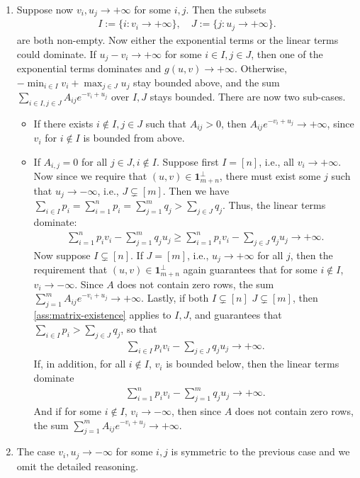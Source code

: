 \begin{enumerate}
     \item Suppose now $v_i, u_j\rightarrow +\infty$ for some $i,j$. Then the subsets 
\begin{align*}
    I:=\{i: v_i \rightarrow +\infty\},\quad J:=\{j: u_j \rightarrow +\infty\}.
\end{align*}
    are both non-empty. Now either the exponential terms or the linear terms could dominate. If $u_j-v_i \rightarrow +\infty$ for some $i\in I, j\in J$, then one of the exponential terms dominates and $g(u,v)\rightarrow +\infty$. Otherwise, $-\min_{i\in I} v_i+\max_{j\in J} u_j$ stay bounded above, and the sum $\sum_{i\in I, j\in J}A_{ij}e^{-v_{i}+u_{j}}$ over $I,J$ stays bounded. There are now two sub-cases. 
     \begin{itemize}
         \item If there exists $i \notin I,j\in J$ such that $A_{ij} >0$, then  $A_{ij}e^{-v_{i}+u_{j}} \rightarrow +\infty$, since $v_i$ for $i\notin I$ is bounded from above.
         \item If $A_{i,j}=0$ for all $j\in J,i\notin I$. Suppose first $I=[n]$, i.e., all $v_i \rightarrow +\infty$. Now since we require that $(u,v) \in 
 \mathbf{1}_{m+n}^\perp$, there must exist some $j$ such that $u_j \rightarrow -\infty$, i.e., $J\subsetneq [m]$. Then we have $\sum_{i\in I} p_i=\sum_{i=1}^n p_i=\sum_{j=1}^m q_j > \sum_{j\in J} q_j$. 
 Thus, the linear terms dominate:  
  \begin{align*}
\sum_{i=1}^{n}p_{i}v_{i}-\sum_{j=1}^{m}q_{j}u_{j} \geq  \sum_{i=1}^{n}p_{i}v_{i}-\sum_{j\in J}q_{j}u_{j} \rightarrow +\infty.
     \end{align*}
         Now suppose $I \subsetneq [n]$. If $J=[m]$, i.e., $u_j \rightarrow+\infty$ for all $j$, then the requirement that $(u,v) \in 
 \mathbf{1}_{m+n}^\perp$ again guarantees that for some $i\notin I$, $v_i \rightarrow -\infty$. Since $A$ does not contain zero rows, the sum $\sum_{j=1}^m A_{ij}e^{-v_{i}+u_{j}} \rightarrow +\infty$.
         Lastly, if both  $I\subsetneq [n]$ $J\subsetneq [m]$,  then \cref{ass:matrix-existence} applies to $I,J$, and guarantees that $\sum_{i\in I} p_i > \sum_{j\in J} q_j$, so that
          \begin{align*}
\sum_{i\in I}p_{i}v_{i}-\sum_{j\in J}q_{j}u_{j} \rightarrow +\infty.
     \end{align*}
     If, in addition, for all $i\notin I$, $v_i$ is bounded below, then the linear terms dominate
     \begin{align*}
\sum_{i=1}^{n}p_{i}v_{i}-\sum_{j=1}^{m}q_{j}u_{j} \rightarrow +\infty.
     \end{align*}
     And if for some $i\notin I$, $v_i \rightarrow -\infty$, then since $A$ does not contain zero rows, the sum $\sum_{j=1}^m A_{ij}e^{-v_{i}+u_{j}} \rightarrow +\infty$.  
     \end{itemize}
     \item The case $v_i, u_j\rightarrow -\infty$ for some $i,j$ is symmetric to the previous case and we omit the detailed reasoning.   
 \end{enumerate}
 
